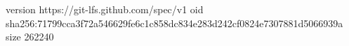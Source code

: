 version https://git-lfs.github.com/spec/v1
oid sha256:71799cca3f72a546629fe6c1c858dc834e283d242cf0824e7307881d5066939a
size 262240
